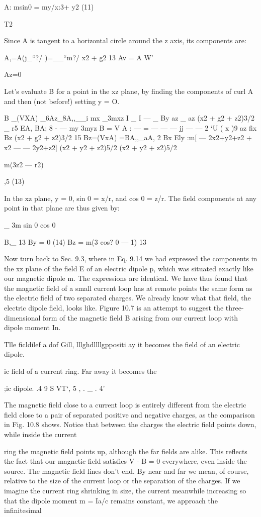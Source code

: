 {A: msin0 = my/x:3+ y2 (11)

T2

Since A is tangent to a horizontal circle around the z axis, its components
are:

A,=A(j_``?/ )=__``m?/
\/x2 + g2 13
Av = A  W'

Az=0

Let's evaluate B for a point in the xz plane, by finding the components
of curl A and then (not before!) setting y = O.

B _(VXA) _6Az_8A,,__i mx _3mxz
I _ I  --- _ By az _ az (x2 + g2 + z2)3/2 _ r5
EA, BA; 8 - --- my 3myz
B = V A :  ---  =  ---  ---  --- jj ---  ---  2
‘U ( x )9 az fix Bz (x2 + g2 + z2)3/2 15
Bz=(VxA) =BA,,_aA,
2 Bx Ely
:m[ --- 2x2+y2+z2 + x2 ---  --- 2y2+z2]
(x2 + y2 + z2)5/2 (x2 + y2 + z2)5/2

m(3z2  ---  r2)

,5 (13)

In the xz plane, y = 0, sin 0 = x/r, and cos 0 = z/r. The field components
at any point in that plane are thus given by:

_ 3m sin 0 cos 0

B,_ 13
By = 0 (14)
Bz = m(3 cos? 0  ---  1)
13

Now turn back to Sec. 9.3, where in Eq. 9.14 we had expressed
the components in the xz plane of the field E of an electric dipole p,
which was situated exactly like our magnetic dipole m. The expressions
are identical. We have thus found that the magnetic field of a
small current loop has at remote points the same form as the electric
field of two separated charges. We already know what that field,
the electric dipole field, looks like. Figure 10.7 is an attempt to
suggest the three-dimensional form of the magnetic field B arising
from our current loop with dipole moment In.

 

Tlle  ficldilef a  dof Gill, lllghdllllgppositi
ay it becomes the field of an electric dipole.

ic field of a current ring. Far away it becomes the

;ic dipole.
.4 9 S VT‘, 5 , . _ . 4'

The magnetic field close to a current loop is entirely different from
the electric field close to a pair of separated positive and negative
charges, as the comparison in Fig. 10.8 shows. Notice that between
the charges the electric field points down, while inside the current

ring the magnetic field points up, although the far fields are alike.
This reflects the fact that our magnetic field satisfies V - B = 0 
everywhere, even inside the source. The magnetic field lines don't end.
By near and far we mean, of course, relative to the size of the current
loop or the separation of the charges. If we imagine the current ring
shrinking in size, the current meanwhile increasing so that the dipole
moment m = Ia/c remains constant, we approach the infinitesimal

}
